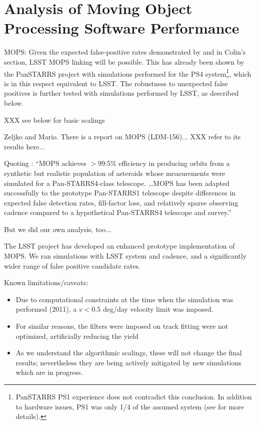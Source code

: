 
\section{Analysis of Moving Object Processing Software Performance}


MOPS: Given the expected false-positive rates demonstrated by
\cite{goldstein15} and in Colin's  section, LSST MOPS linking will
be possible. This has already been shown by the PanSTARRS project 
with simulations performed for the PS4 system\footnote{PanSTARRS 
PS1 experience does not contradict this conclusion. In addition to 
hardware issues, PS1 was only 1/4 of the assumed system (see 
\citep{denneau13} for more details). }, which is in this
respect equivalent to LSST. The robustness to unexpected false
positives is further tested with simulations performed by LSST,
as described below. 
   




XXX see below for basic scalings 

Zeljko and Mario. There is a report on MOPS (LDM-156)...   XXX refer to its
results here... 

Quoting \cite{denneau13}: ``MOPS achieves $>$99:5\% efficiency in
producing orbits from a synthetic
but realistic population of asteroids whose measurements were
simulated for a Pan-STARRS4-class telescope. \dots MOPS has been
adapted successfully to the prototype Pan-STARRS1 telescope despite
differences in expected false detection rates, fill-factor loss, and
relatively sparse observing cadence compared to a hypothetical
Pan-STARRS4 telescope and survey.'' 

But we did our own analysis, too...

The LSST project has developed an enhanced prototype implementation of MOPS.
We ran simulations with LSST system and cadence, and a significantly
wider range of false positive candidate rates. 

Known limitations/caveats:
\begin{itemize}
\item Due to computational constraints at the time when the simulation
  was performed (2011), a $v < 0.5$ deg/day velocity limit was
  imposed.
\item For similar reasons, the filters were imposed on track fitting
  were not optimized, artificially reducing the yield
\item As we understand the algorithmic scalings, these will not change the
final results; nevertheless they are being actively mitigated by new
simulations which are in progress.
\end{itemize}


